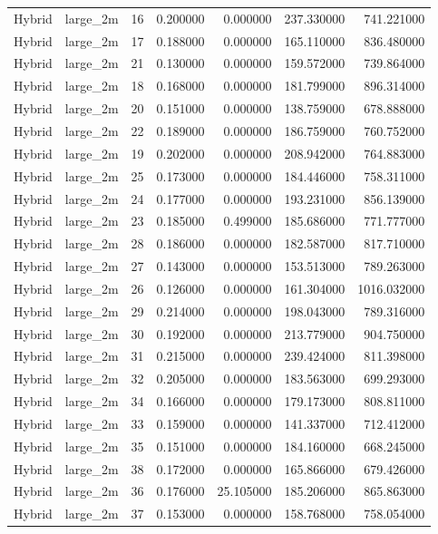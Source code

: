 \begin{tabular}{llrrrrr}
Hybrid & large_2m & 16 & 0.200000 & 0.000000 & 237.330000 & 741.221000 \\
Hybrid & large_2m & 17 & 0.188000 & 0.000000 & 165.110000 & 836.480000 \\
Hybrid & large_2m & 21 & 0.130000 & 0.000000 & 159.572000 & 739.864000 \\
Hybrid & large_2m & 18 & 0.168000 & 0.000000 & 181.799000 & 896.314000 \\
Hybrid & large_2m & 20 & 0.151000 & 0.000000 & 138.759000 & 678.888000 \\
Hybrid & large_2m & 22 & 0.189000 & 0.000000 & 186.759000 & 760.752000 \\
Hybrid & large_2m & 19 & 0.202000 & 0.000000 & 208.942000 & 764.883000 \\
Hybrid & large_2m & 25 & 0.173000 & 0.000000 & 184.446000 & 758.311000 \\
Hybrid & large_2m & 24 & 0.177000 & 0.000000 & 193.231000 & 856.139000 \\
Hybrid & large_2m & 23 & 0.185000 & 0.499000 & 185.686000 & 771.777000 \\
Hybrid & large_2m & 28 & 0.186000 & 0.000000 & 182.587000 & 817.710000 \\
Hybrid & large_2m & 27 & 0.143000 & 0.000000 & 153.513000 & 789.263000 \\
Hybrid & large_2m & 26 & 0.126000 & 0.000000 & 161.304000 & 1016.032000 \\
Hybrid & large_2m & 29 & 0.214000 & 0.000000 & 198.043000 & 789.316000 \\
Hybrid & large_2m & 30 & 0.192000 & 0.000000 & 213.779000 & 904.750000 \\
Hybrid & large_2m & 31 & 0.215000 & 0.000000 & 239.424000 & 811.398000 \\
Hybrid & large_2m & 32 & 0.205000 & 0.000000 & 183.563000 & 699.293000 \\
Hybrid & large_2m & 34 & 0.166000 & 0.000000 & 179.173000 & 808.811000 \\
Hybrid & large_2m & 33 & 0.159000 & 0.000000 & 141.337000 & 712.412000 \\
Hybrid & large_2m & 35 & 0.151000 & 0.000000 & 184.160000 & 668.245000 \\
Hybrid & large_2m & 38 & 0.172000 & 0.000000 & 165.866000 & 679.426000 \\
Hybrid & large_2m & 36 & 0.176000 & 25.105000 & 185.206000 & 865.863000 \\
Hybrid & large_2m & 37 & 0.153000 & 0.000000 & 158.768000 & 758.054000 \\

\end{tabular}
